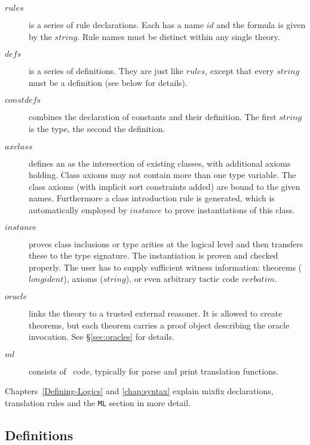\begin{description}
\item[$rules$]
  is a series of rule declarations.  Each has a name $id$ and the formula is
  given by the $string$.  Rule names must be distinct within any single
  theory.

\item[$defs$] is a series of definitions.  They are just like $rules$, except
  that every $string$ must be a definition (see below for details).

\item[$constdefs$] combines the declaration of constants and their
  definition.  The first $string$ is the type, the second the definition.
  
\item[$axclass$]  defines an
   as the intersection of existing
  classes, with additional axioms holding.  Class axioms may not
  contain more than one type variable.  The class axioms (with implicit
  sort constraints added) are bound to the given names.  Furthermore a
  class introduction rule is generated, which is automatically
  employed by $instance$ to prove instantiations of this class.
  
\item[$instance$]  proves class inclusions or
  type arities at the logical level and then transfers these to the
  type signature.  The instantiation is proven and checked properly.
  The user has to supply sufficient witness information: theorems
  ($longident$), axioms ($string$), or even arbitrary \ML{} tactic
  code $verbatim$.

\item[$oracle$] links the theory to a trusted external reasoner.  It is
  allowed to create theorems, but each theorem carries a proof object
  describing the oracle invocation.  See \S\ref{sec:oracles} for details.

\item[$ml$] 
  consists of \ML\ code, typically for parse and print translation functions.
\end{description}
%
Chapters~\ref{Defining-Logics} and \ref{chap:syntax} explain mixfix
declarations, translation rules and the {\tt ML} section in more detail.


\subsection{Definitions}

